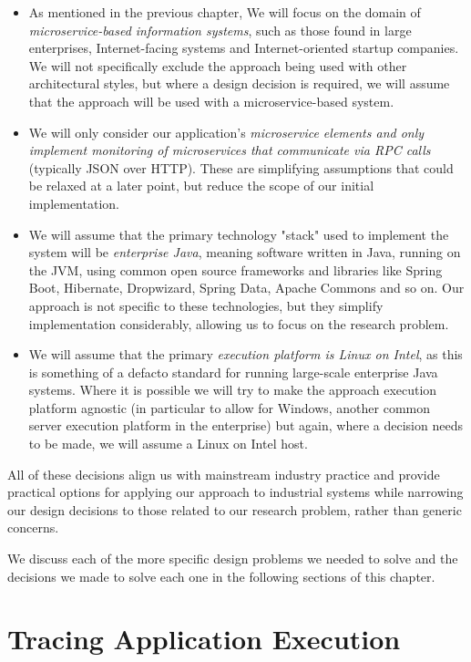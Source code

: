 \begin{itemize}
	\item As mentioned in the previous chapter, We will focus on the domain of \emph{microservice-based information systems}, such as those found in large enterprises, Internet-facing systems and Internet-oriented startup companies.  We will not specifically exclude the approach being used with other architectural styles, but where a design decision is required, we will assume that the approach will be used with a microservice-based system.
	\item We will only consider our application's \emph{microservice elements and only implement monitoring of microservices that communicate via RPC calls} (typically JSON over HTTP).  These are simplifying assumptions that could be relaxed at a later point, but reduce the scope of our initial implementation.
	\item We will assume that the primary technology "stack" used to implement the system will be \emph{enterprise Java}, meaning software written in Java, running on the JVM, using common open source frameworks and libraries like Spring Boot, Hibernate, Dropwizard, Spring Data, Apache Commons and so on.  Our approach is not specific to these technologies, but they simplify implementation considerably, allowing us to focus on the research problem.
	\item We will assume that the primary \emph{execution platform is Linux on Intel}, as this is something of a defacto standard for running large-scale enterprise Java systems.  Where it is possible we will try to make the approach execution platform agnostic (in particular to allow for Windows, another common server execution platform in the enterprise) but again, where a decision needs to be made, we will assume a Linux on Intel host.
\end{itemize}

All of these decisions align us with mainstream industry practice and provide practical options for applying our approach to industrial systems while narrowing our design decisions to those related to our research problem, rather than generic concerns.

We discuss each of the more specific design problems we needed to solve and the decisions we made to solve each one in the following sections of this chapter.

\section{Tracing Application Execution}

